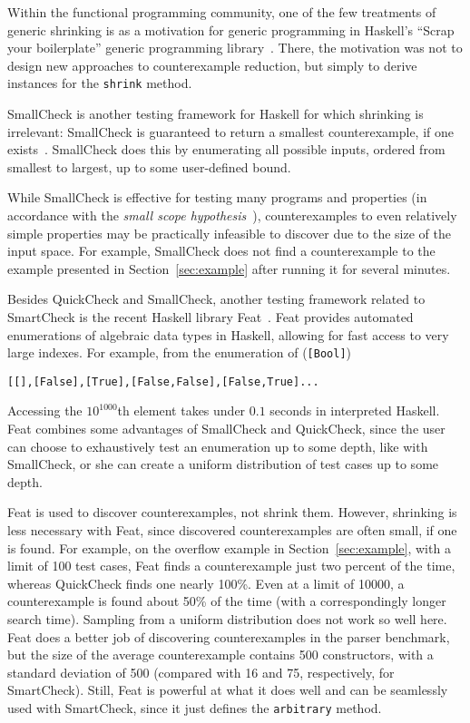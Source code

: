 \documentclass{sigplanconf}
\newenvironment{code}{\begin{alltt}\footnotesize}{\end{alltt}}
\newcommand{\ttp}[1]{\texttt{#1}}
\begin{document}
Within the functional programming community, one of the few treatments of
generic shrinking is as a motivation for generic programming in Haskell's
``Scrap your boilerplate'' generic programming library~\cite{syb}.  There, the
motivation was not to design new approaches to counterexample reduction, but
simply to derive instances for the \ttp{shrink} method.

SmallCheck is another testing framework for Haskell for which shrinking is
irrelevant: SmallCheck is guaranteed to return a smallest counterexample, if
one exists~\cite{sc}.  SmallCheck does this by enumerating all possible inputs,
ordered from smallest to largest, up to some user-defined bound.

While SmallCheck is effective for testing many programs and properties (in
accordance with the \emph{small scope hypothesis}~\cite{jackson}),
counterexamples to even relatively simple properties may be practically
infeasible to discover due to the size of the input space.  For example,
SmallCheck does not find a counterexample to the example presented in
Section~\ref{sec:example} after running it for several minutes.

Besides QuickCheck and SmallCheck, another testing framework related to
SmartCheck is the recent Haskell library Feat~\cite{feat}.  Feat provides
automated enumerations of algebraic data types in Haskell, allowing for fast
access to very large indexes.  For example, from the enumeration of
(\ttp{[Bool]})
%
\begin{code}
[[],[False],[True],[False,False],[False,True] ...
\end{code}
%
\noindent
Accessing the $10^{1000}$th element takes under $0.1$ seconds in interpreted
Haskell.  Feat combines some advantages of SmallCheck and QuickCheck, since the
user can choose to exhaustively test an enumeration up to some depth, like with
SmallCheck, or she can create a uniform distribution of test cases up to some
depth.

Feat is used to discover counterexamples, not shrink them.  However, shrinking
is less necessary with Feat, since discovered counterexamples are often small,
if one is found.  For example, on the overflow example in
Section~\ref{sec:example}, with a limit of 100 test cases, Feat finds a
counterexample just two percent of the time, whereas QuickCheck finds one nearly
100\%.  Even at a limit of 10000, a counterexample is found about 50\% of the
time (with a correspondingly longer search time).  Sampling from a uniform
distribution does not work so well here.  Feat does a better job of discovering
counterexamples in the parser benchmark, but the size of the average
counterexample contains 500 constructors, with a standard deviation of 500
(compared with 16 and 75, respectively, for SmartCheck).  Still, Feat is
powerful at what it does well and can be seamlessly used with SmartCheck, since
it just defines the \ttp{arbitrary} method.
\end{document}
